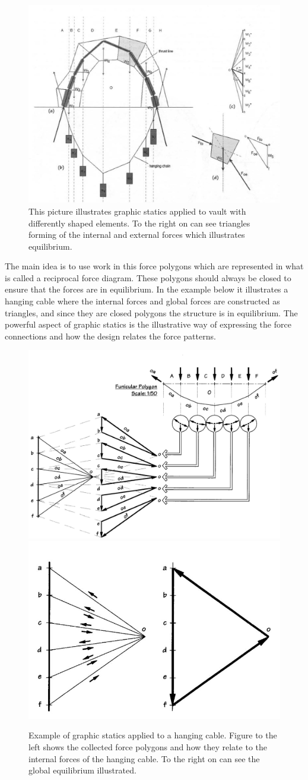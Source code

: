 \begin{figure}[H]
\centering
\includegraphics[width=0.8\linewidth ]{figure/Introduction/GraphStat4.JPG}
\caption{This picture illustrates graphic statics applied to vault with differently shaped elements. To the right on can see triangles forming of the internal and external forces which illustrates equilibrium.\cite{ref:Form} }
\end{figure}

The main idea is to use work in this force polygons which are represented in what is called a reciprocal force diagram. These polygons should always be closed to ensure that the forces are in equilibrium. In the example below it illustrates a hanging cable where the internal forces and global forces are constructed as triangles, and since they are closed polygons the structure is in equilibrium. The powerful aspect of graphic statics is the illustrative way of expressing the force connections and how the design relates the force patterns.   


\begin{figure}[H]
\centering
\includegraphics[width=0.6\linewidth ]{figure/Introduction/GraphStat2.JPG}
\includegraphics[width=0.35\linewidth ]{figure/Introduction/GraphStat3.JPG}
\caption{Example of graphic statics applied to a hanging cable. Figure to the left shows the collected force polygons and how they relate to the internal forces of the hanging cable. To the right on can see the global equilibrium illustrated. \cite{ref:Form} }
\end{figure}


